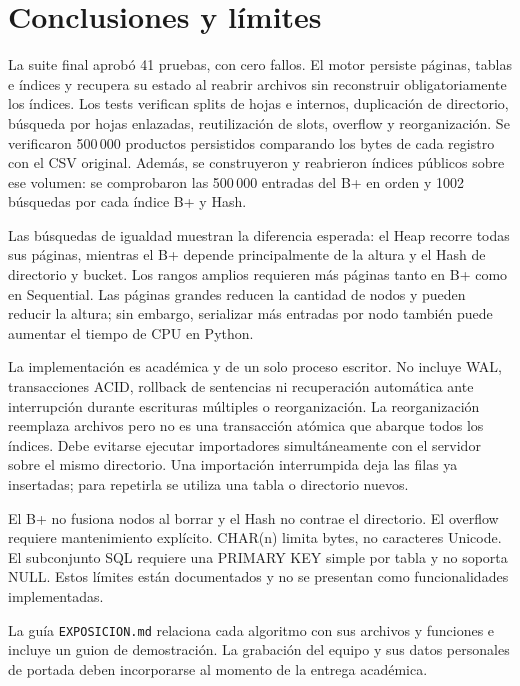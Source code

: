 \section{Conclusiones y límites}
La suite final aprobó 41 pruebas, con cero fallos. El motor persiste páginas, tablas e índices y recupera su estado al reabrir archivos sin reconstruir obligatoriamente los índices. Los tests verifican splits de hojas e internos, duplicación de directorio, búsqueda por hojas enlazadas, reutilización de slots, overflow y reorganización. Se verificaron 500\,000 productos persistidos comparando los bytes de cada registro con el CSV original. Además, se construyeron y reabrieron índices públicos sobre ese volumen: se comprobaron las 500\,000 entradas del B+ en orden y 1002 búsquedas por cada índice B+ y Hash.

Las búsquedas de igualdad muestran la diferencia esperada: el Heap recorre todas sus páginas, mientras el B+ depende principalmente de la altura y el Hash de directorio y bucket. Los rangos amplios requieren más páginas tanto en B+ como en Sequential. Las páginas grandes reducen la cantidad de nodos y pueden reducir la altura; sin embargo, serializar más entradas por nodo también puede aumentar el tiempo de CPU en Python.

La implementación es académica y de un solo proceso escritor. No incluye WAL, transacciones ACID, rollback de sentencias ni recuperación automática ante interrupción durante escrituras múltiples o reorganización. La reorganización reemplaza archivos pero no es una transacción atómica que abarque todos los índices. Debe evitarse ejecutar importadores simultáneamente con el servidor sobre el mismo directorio. Una importación interrumpida deja las filas ya insertadas; para repetirla se utiliza una tabla o directorio nuevos.

El B+ no fusiona nodos al borrar y el Hash no contrae el directorio. El overflow requiere mantenimiento explícito. CHAR(n) limita bytes, no caracteres Unicode. El subconjunto SQL requiere una PRIMARY KEY simple por tabla y no soporta NULL. Estos límites están documentados y no se presentan como funcionalidades implementadas.

La guía \texttt{EXPOSICION.md} relaciona cada algoritmo con sus archivos y funciones e incluye un guion de demostración. La grabación del equipo y sus datos personales de portada deben incorporarse al momento de la entrega académica.
